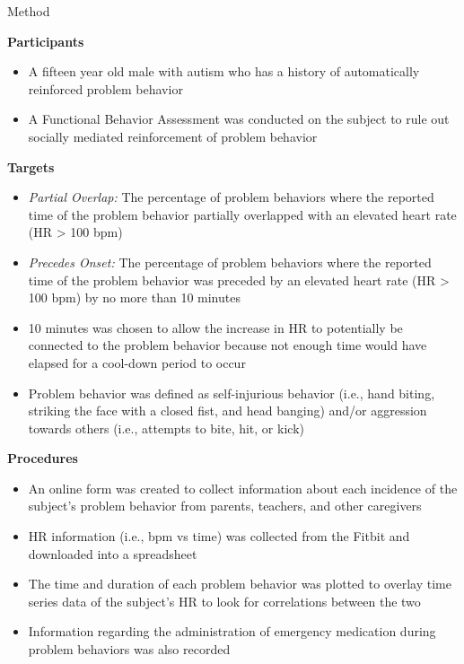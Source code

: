 \documentclass[final]{beamer}
\newlength{\onecolwid}
\begin{document}
\begin{frame}[t]
\begin{columns}[t]
\begin{column}{\onecolwid}
\begin{alertblock}{Method}
	\begin{center}
		\textbf{Participants}
	\end{center}
	\begin{itemize}
		\item A fifteen year old male with autism who has a history of automatically reinforced problem behavior
		\item A Functional Behavior Assessment was conducted on the subject to rule out socially mediated reinforcement of problem behavior
	\end{itemize}

	\begin{center}
		\textbf{Targets}
	\end{center}
	\begin{itemize}
		\item \textit{Partial Overlap:} The percentage of problem behaviors where the reported time of the problem behavior partially overlapped with an elevated heart rate (HR > 100 bpm)
		\item \textit{Precedes Onset:} The percentage of problem behaviors where the reported time of the problem behavior was preceded by an elevated heart rate (HR > 100 bpm) by no more than 10 minutes
		\item 10 minutes was chosen to allow the increase in HR to potentially be connected to the problem behavior because not enough time would have elapsed for a cool-down period to occur
		\item Problem behavior was defined as self-injurious behavior (i.e., hand biting, striking the face with a closed fist, and head banging) and/or aggression towards others (i.e., attempts to bite, hit, or kick)
	\end{itemize}

	\begin{center}
		\textbf{Procedures}
	\end{center}
	\begin{itemize}
		\item An online form was created to collect information about each incidence of the subject's problem behavior from parents, teachers, and other caregivers
		\item HR information (i.e., bpm vs time) was collected from the Fitbit and downloaded into a spreadsheet
		\item The time and duration of each problem behavior was plotted to overlay time series data of the subject's HR to look for correlations between the two
		\item Information regarding the administration of emergency medication during problem behaviors was also recorded
	\end{itemize}


\end{alertblock}
\end{column}
\end{columns}
\end{frame}
\end{document}
